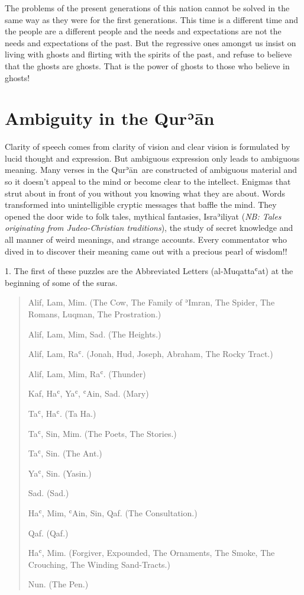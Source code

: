 \documentclass[12pt]{memoir}
\def\´{ʾ} %
\def\`{ʿ} %
\newcommand{\ar}[1]{\RL{\arabicfont#1}}
\def \Quran{Qur\-\´ān} %
\def\–{-\hskip0pt}
\def\pardivider{\centerline{\ar{۞۞۞}}} %
\newcommand{\NB}[1]{\emph{\small NB: #1}}
\begin{document}
The problems of the present generations of this nation cannot be solved
in the same way as they were for the first generations.
This time is a different time and the people are a different people
and the needs and expectations are not the needs and expectations of the past.
But the regressive ones amongst us insist on living with ghosts
and flirting with the spirits of the past,
and refuse to believe that the ghosts are ghosts.
That is the power of ghosts to those who believe in ghosts!

\pardivider


\section{Ambiguity in the \Quran}

Clarity of speech comes from clarity of vision
and clear vision is formulated by lucid thought and expression.
But ambiguous expression only leads to ambiguous meaning.
Many verses in the \Quran\ are constructed of ambiguous material
and so it doesn’t appeal to the mind or become clear to the intellect.
Enigmas that strut about in front of you
without you knowing what they are about.
Words transformed into unintelligible cryptic messages that baffle the mind.
They opened the door wide to folk tales, mythical fantasies, Isra\´iliyat
(\NB{Tales originating from Judeo\–Christian traditions}),
the study of secret knowledge and all manner of weird meanings,
and strange accounts.
Every commentator who dived in to discover their meaning
came out with a precious pearl of wisdom!!

1. The first of these puzzles are the Abbreviated Letters (al\–Muqatta\`at)
at the beginning of some of the suras.

\begin{quote}
Alif, Lam, Mim.
(The Cow, The Family of \´Imran, The Spider,
The Romans, Luqman, The Prostration.)

Alif, Lam, Mim, Sad. (The Heights.)

Alif, Lam, Ra\`.
(Jonah, Hud, Joseph, Abraham, The Rocky Tract.)

Alif, Lam, Mim, Ra\`. (Thunder)

Kaf, Ha\`, Ya\`, \`Ain, Sad. (Mary)

Ta\`, Ha\`. (Ta Ha.)

Ta\`, Sin, Mim. (The Poets, The Stories.)

Ta\`, Sin. (The Ant.)

Ya\`, Sin. (Yasin.)

Sad. (Sad.)

Ha\`, Mim, \`Ain, Sin, Qaf. (The Consultation.)

Qaf. (Qaf.)

Ha\`, Mim.
(Forgiver, Expounded, The Ornaments, The Smoke,
The Crouching, The Winding Sand-Tracts.)

Nun. (The Pen.)
\end{quote}
\end{document}
